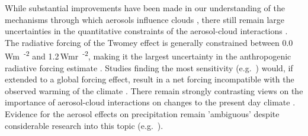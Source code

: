 

While substantial improvements have been made in our understanding of the mechanisms through which aerosols influence clouds \citep{fan_review_2016}, there still remain large uncertainties in the quantitative constraints of the aerosol-cloud interactions \citep{IPCCRadiativeForcingMyhre2013}.
The radiative forcing of the Twomey effect is generally constrained between 0.0\,\unit{Wm\textsuperscript{-2}} and 1.2\,\unit{Wmr\textsuperscript{-2}}, making it the largest uncertainty in the anthropogenic radiative forcing estimate \citep{IPCCRadiativeForcingMyhre2013}.
Studies finding the most sensitivity (e.g.\ \citep{rosenfeld_aerosol-driven_2019}) would, if extended to a global forcing effect, result in a net forcing incompatible with the observed warming of the climate \citep{stevens_rethinking_2015}.
There remain strongly contrasting views on the importance of aerosol-cloud interactions on changes to the present day climate \citep{stevens_climate_2012}. 
Evidence for the aerosol effects on precipitation remain 'ambiguous' \citep{IPCCCloudsAeorosolsBoucher2013} despite considerable research into this topic (e.g.\ \citet{levin_aerosol_2008, tao_impact_2012}).



